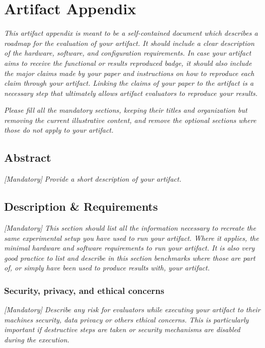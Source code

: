 %

\appendix
\section{Artifact Appendix}
\textit{This artifact appendix is meant to be a self-contained document which
describes a roadmap for the evaluation of your artifact. It should include a
clear description of the hardware, software, and configuration requirements. In
case your artifact aims to receive the functional or results reproduced badge,
it should also include the major claims made by your paper and instructions on
how to reproduce each claim through your artifact. Linking the claims of your
paper to the artifact is a necessary step that ultimately allows artifact
evaluators to reproduce your results.}

\textit{Please fill all the mandatory sections, keeping their titles and
organization but removing the current illustrative content, and remove the
optional sections where those do not apply to your artifact.}

\subsection{Abstract}
{\em [Mandatory]}
{\em Provide a short description of your artifact.}

\subsection{Description \& Requirements}

\textit{[Mandatory] This section should list all the information necessary to
recreate the same experimental setup you have used to run your artifact. Where
it applies, the minimal hardware and software requirements to run your artifact.
It is also very good practice to list and describe in this section benchmarks
where those are part of, or simply have been used to produce results with, your
artifact.}

\subsubsection{Security, privacy, and ethical concerns}
\textit{[Mandatory] Describe any risk for evaluators while executing your
artifact to their machines security, data privacy or others ethical concerns.
This is particularly important if destructive steps are taken or security
mechanisms are disabled during the execution.}

